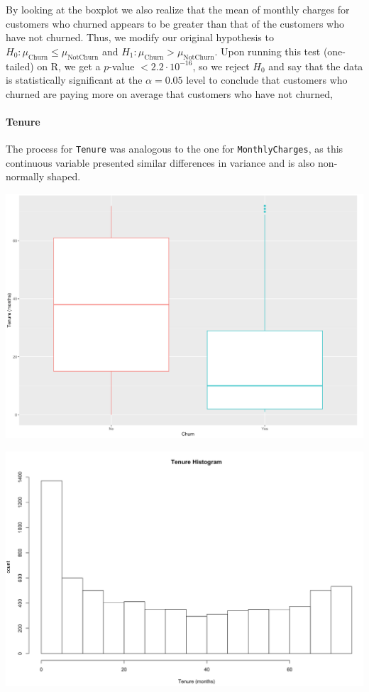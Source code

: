 \documentclass[man, floatsintext]{apa6}
\begin{document}
\hspace{0.5mm}

By looking at the boxplot we also realize that the mean of monthly charges for customers who churned appears to be greater than that of the customers who have not churned. Thus, we modify our original hypothesis to $H_0: \mu_{\text{Churn}} \leq \mu_{\text{NotChurn}}$ and $H_1: \mu_{\text{Churn}} > \mu_{\text{NotChurn}}$. Upon running this test (one-tailed) on R, we get a $p$-value $< 2.2 \cdot 10^{-16}$, so we reject $H_0$ and say that the data is statistically significant  at the $\alpha = 0.05$ level to conclude that customers who churned are paying more on average that customers who have not churned,
\paragraph{Tenure}

The process for \texttt{Tenure} was analogous to the one for \texttt{MonthlyCharges}, as this continuous variable presented similar differences in variance and is also non-normally shaped.

\hspace{0.5mm}

\noindent\begin{minipage}{0.485\textwidth}
\includegraphics[width = \linewidth]{boxplot_tenurebyChurn}
\end{minipage}
\hfill
\begin{minipage}{0.5\textwidth}
\includegraphics[width = \linewidth]{histogram_Tenure}
\end{minipage}
\end{document}
